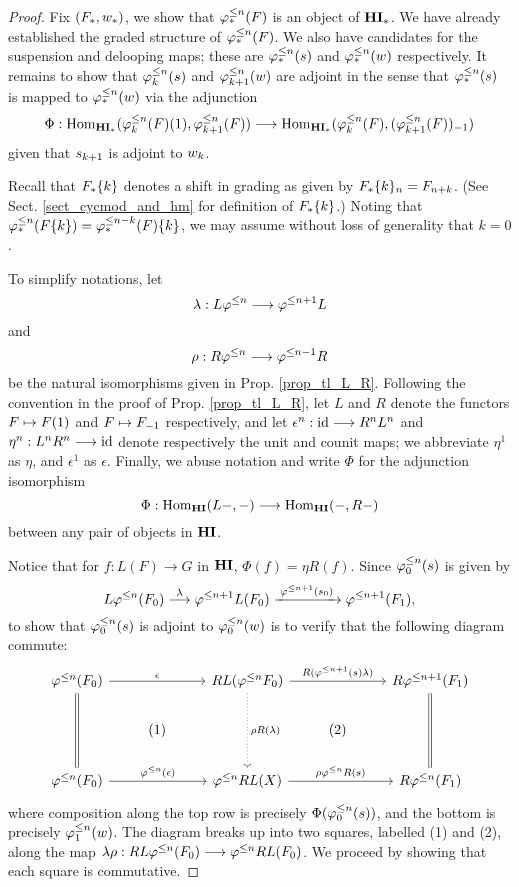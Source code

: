 \begin{proof}
Fix $(F_*, \deloop_*)$, we show that $\tlHM{n}(F)$ is an object of
$\HM$. We have already established the graded structure of 
$\tlHM{n}(F)$. We also have candidates for the suspension and 
delooping maps; these are $\suspTL{n}$ and $\deloopTL{n}$ 
respectively. It remains to show that $\suspTL[k]{n}$ and 
$\deloopTL[k + 1]{n}$ are adjoint in the sense that $\suspTL{n}$ is 
mapped to $\deloopTL{n}$ via the adjunction 
\[
\Phi: \homHM(\LHI{\tlHM[k]{n}(F)}, \tlHM[k + 1]{n}(F))
\to \homHM(\tlHM[k]{n}(F), \RHI{(\tlHM[k + 1]{n}(F))})
\]
given that $\susp_{k + 1}$ is adjoint to $\deloop_k$.

Recall that $\shift[k]{F_*}$ denotes a shift in grading as given by 
$\shift[k]{F_*}_n = F_{n + k}$. (See Sect. \ref{sect_cycmod_and_hm} 
for definition of $\shift[k]{F_*}$.) Noting that 
$\tlHM{n}(\shift[k]{F}) = \shift[k]{\tlHM{n - k}(F)}$, we may 
assume without loss of generality that $k = 0$. 

To simplify notations, let
\[
\lambda : L\tlHI{n} \to \tlHI{n + 1}L
\]
and 
\[
\rho : R\tlHI{n} \to \tlHI{n - 1}R
\]
be the natural isomorphisms given in Prop. \ref{prop_tl_L_R}. 
Following the convention in the proof of Prop. \ref{prop_tl_L_R}, 
let $L$ and $R$ denote the functors $F \mapsto \LHI{F}$ and $F 
\mapsto \RHI{F}$ respectively, and let $\epsilon^n : \id \to 
R^nL^n$ and $\eta^n: L^nR^n \to \id$ denote respectively the unit 
and counit maps; we abbreviate $\eta^1$ as $\eta$, and $\epsilon^1$
as $\epsilon$. Finally, we abuse notation and write $\Phi$ for the 
adjunction isomorphism
\[
\Phi: \homHI(L-, -) \to \homHI(-,R-)
\]
between any pair of objects in $\HI$.

Notice that for $f: L(F) \to G$ in $\HI$, $\Phi(f) = \eta R(f)$.
Since $\suspTL[0]{n}$ is given by
\[
L\tlHI{n}(F_0) \stackrel{\lambda}{\to} \tlHI{n + 1} L(F_0)
   \xrightarrow{\;\tlHI{n + 1}(\susp_0)\;} \tlHI{n + 1}(F_1),
\]
to show that $\suspTL[0]{n}$ is adjoint to $\deloopTL[0]{n}$ is to
verify that the following diagram commute:
\[
\begin{tikzcd}
\tlHI{n}(F_0) \arrow{rr}{\epsilon} \arrow[equals]{dd} &&
RL (\tlHI{n}F_0) \arrow{rr}{R(\tlHI{n + 1}(\susp) \lambda)} 
\arrow[dotted]{dd}{\rho R(\lambda)}&&
R \tlHI{n + 1} (F_1) \arrow[equals]{dd} \\
& (1) && (2) \\
\tlHI{n}(F_0) \arrow{rr}{\tlHI{n}(\epsilon)} &&
\tlHI{n} RL(X) \arrow{rr}{\rho \tlHI{n} R(\susp)} &&
R\tlHI{n}(F_1)
\end{tikzcd}
\]
where composition along the top row is precisely 
$\Phi(\suspTL[0]{n})$, and the bottom is precisely 
$\deloopTL[1]{n}$. The diagram breaks up into two squares,
labelled (1) and (2), along the map $\lambda \rho: RL 
\tlHI{n}(F_0) \to \tlHI{n} RL(F_0)$. We proceed by showing that 
each square is commutative.


\end{proof}
